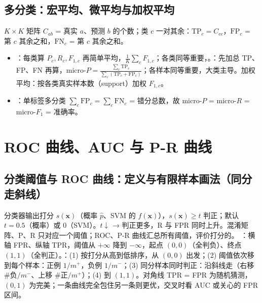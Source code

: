 \subsection{多分类：宏平均、微平均与加权平均}
$K\times K$ 矩阵 $C_{ab}$ = 真实 $a$、预测 $b$ 的个数；类 $c$ 一对其余：$\mathrm{TP}_c=C_{cc}$，$\mathrm{FP}_c$ = 第 $c$ 其余之和，$\mathrm{FN}_c$ = 第 $c$ 其余之和。
\begin{itemize}
\item {}：每类算 $P_c,R_c,F_{1,c}$ 再简单平均，$\frac1K\sum_cF_{1,c}$；各类同等重要，。：先加总 TP、FP、FN 再算，$\text{micro-}P=\frac{\sum_c\mathrm{TP}_c}{\sum_c(\mathrm{TP}_c+\mathrm{FP}_c)}$；各样本同等重要，大类主导。加权平均：按各类真实样本数（support）加权 $F_{1,c}$。
\item {}：单标签多分类 $\sum_c\mathrm{FP}_c=\sum_c\mathrm{FN}_c$ = 错分总数，故 micro-$P$ = micro-$R$ = micro-$F_1$ = 准确率。
\end{itemize}

\section{ROC 曲线、AUC 与 P-R 曲线}

\subsection{分类阈值与 ROC 曲线：定义与有限样本画法（同分走斜线）}
分类器输出打分 $s(\bm x)$（概率 $\hat p$、SVM 的 $f(\bm x)$），$s(\bm x)\ge t$ 判正；默认 $t=0.5$（概率）或 0（SVM）。$t\downarrow$ → 判正更多，R 与 FPR 同时上升。混淆矩阵、P、R 只对应一个阈值；ROC、P-R 曲线汇总所有阈值，评价打分的。
：横轴 FPR、纵轴 TPR，阈值从 $+\infty$ 降到 $-\infty$，起点 $(0,0)$（全判负）、终点 $(1,1)$（全判正）。：(1) 按打分从高到低排序，从 $(0,0)$ 出发；(2) 阈值依次移到每个样本：正例 $1/m^+$，负例 $1/m^-$；(3) 同分样本同时判正：沿斜线走（右移 \#负$/m^-$、上移 \#正$/m^+$）；(4) 到 $(1,1)$。对角线 TPR = FPR 为随机猜测，$(0,1)$ 为完美；一条曲线完全包住另一条则更优，交叉时看 AUC 或关心的 FPR 区间。

